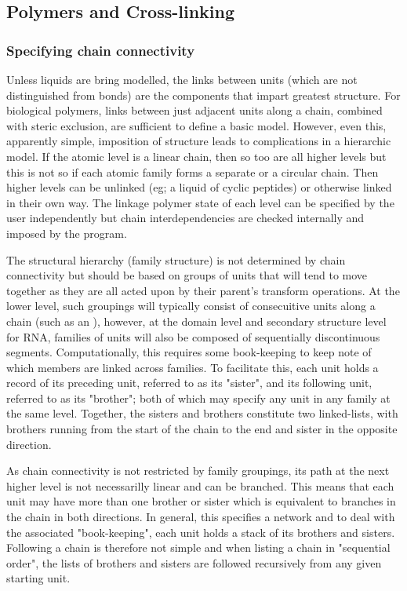 \subsection{Polymers and Cross-linking}

\subsubsection{Specifying chain connectivity}

Unless liquids are bring modelled, the links between units (which are not
distinguished from bonds) are the components that impart greatest structure.
For biological polymers, links between just adjacent units along a chain,
combined with steric exclusion, are sufficient to define a basic model. However,
even this, apparently simple, imposition of structure leads to complications
in a hierarchic model.  If the atomic level is a linear chain, then so too
are all higher levels but this is not so if each atomic family forms a separate
or a circular chain.  Then higher levels can be unlinked (eg; a liquid of cyclic
peptides) or otherwise linked in their own way.  The linkage polymer state of
each level can be specified by the user independently but chain interdependencies
are checked internally and imposed by the program.

The structural hierarchy (family structure) is not determined by chain
connectivity but should be based on groups of units that will tend to move
together as they are all acted upon by their parent's transform operations.
At the lower level, such groupings will typically consist of consecuitive 
units along a chain (such as an \AH), however, at the domain level and
secondary structure level for RNA, families of units will also be composed of
sequentially discontinuous segments.   Computationally, this requires some
book-keeping to keep note of which members are linked across families.  To
facilitate this, each unit holds a record of its preceding unit, referred to
as its "sister", and its following unit, referred to as its "brother"; both
of which may specify any unit in any family at the same level.  Together,
the sisters and brothers constitute two linked-lists, with brothers running
from the start of the chain to the end and sister in the opposite direction.

As chain connectivity is not restricted by family groupings, its path at 
the next higher level is not necessarilly linear and can be branched.  This
means that each unit may have more than one brother or sister which is
equivalent to branches in the chain in both directions.  In general, this
specifies a network and to deal with the associated "book-keeping", each
unit holds a stack of its brothers and sisters.   Following a chain is therefore
not simple and when listing a chain in "sequential order", the lists of brothers
and sisters are followed recursively from any given starting unit.


